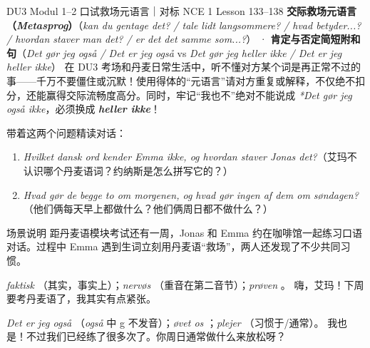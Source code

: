 {DU3 Modul 1--2 口试救场元语言｜对标 NCE 1 Lesson 133--138}
{\textbf{交际救场元语言（\textit{Metasprog}）}（\textit{kan du gentage det? / tale lidt langsommere? / hvad betyder...? / hvordan staver man det? / er det det samme som...?}） · \textbf{肯定与否定简短附和句}（\textit{Det gør jeg også / Det er jeg også} vs \textit{Det gør jeg heller ikke / Det er jeg heller ikke}）}
{在 DU3 考场和丹麦日常生活中，听不懂对方某个词是再正常不过的事——千万不要僵住或沉默！使用得体的“元语言”请对方重复或解释，不仅绝不扣分，还能赢得交际流畅度高分。同时，牢记“我也不”绝对不能说成 \textit{*Det gør jeg også ikke}，必须换成 \textbf{\textit{heller ikke}}！}

\begin{foerduleaeser}
带着这两个问题精读对话：
\begin{enumerate}
  \item \textit{Hvilket dansk ord kender Emma ikke, og hvordan staver Jonas det?}（艾玛不认识哪个丹麦语词？约纳斯是怎么拼写它的？）
  \item \textit{Hvad gør de begge to om morgenen, og hvad gør ingen af dem om søndagen?}（他们俩每天早上都做什么？他们俩周日都不做什么？）
\end{enumerate}
\end{foerduleaeser}


\begin{tipbox}{场景说明}
距丹麦语模块考试还有一周，Jonas 和 Emma 约在咖啡馆一起练习口语对话。过程中 Emma 遇到生词立刻用丹麦语“救场”，两人还发现了不少共同习惯。
\end{tipbox}

{\textit{faktisk} （其实，事实上）；\textit{nervøs} （重音在第二音节）；\textit{prøven} 。}
{嗨，艾玛！下周要考丹麦语了，我其实有点紧张。}

{\textit{Det er jeg også} （\textit{også} 中 g 不发音）；\textit{øvet os} ；\textit{plejer} （习惯于/通常）。}
{我也是！不过我们已经练了很多次了。你周日通常做什么来放松呀？}

